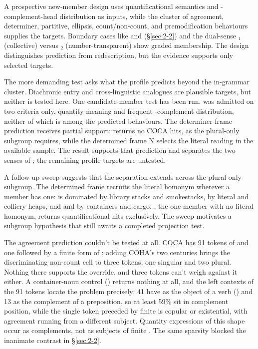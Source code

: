 A prospective new-member design uses quantificational semantics and -complement-head distribution as inputs, while the cluster of agreement, determiner, partitive, ellipsis, count/non-count, and premodification behaviours supplies the targets. Boundary cases like  and  (§\ref{sec:2-2}) and the dual-sense ₁ (collective) versus ₂ (number-transparent) show graded membership. The design distinguishes prediction from redescription, but the evidence supports only selected targets.

The more demanding test asks what the profile predicts beyond the in-grammar cluster. Diachronic entry and cross-linguistic analogues are plausible targets, but neither is tested here. One candidate-member test has been run.  was admitted on two criteria only, quantity meaning and frequent -complement distribution, neither of which is among the predicted behaviours. The determiner-frame prediction receives partial support:  returns no COCA hits, as the plural-only subgroup requires, while the determined frame  N selects the literal reading in the available sample. The result supports that prediction and separates the two senses of ; the remaining profile targets are untested.

A follow-up sweep suggests that the separation extends across the plural-only subgroup. The determined frame recruits the literal homonym wherever a member has one:  is dominated by library stacks and smokestacks,  by literal and colliery heaps, and  and  by containers and cargo. , the one member with no literal homonym, returns quantificational hits exclusively. The sweep motivates a subgroup hypothesis that still awaits a completed projection test.

The agreement prediction couldn't be tested at all. COCA has 91 tokens of  and one followed by a finite form of ; adding COHA's two centuries brings the discriminating non-count cell to three tokens, one singular and two plural. Nothing there supports the override, and three tokens can't weigh against it either. A container-noun control () returns nothing at all, and the left contexts of the 91 tokens locate the problem precisely: 41 have  as the object of a verb () and 13 as the complement of a preposition, so at least 59\% sit in complement position, while the single token preceded by finite  is copular or existential, with agreement running from a different subject. Quantity expressions of this shape occur as complements, not as subjects of finite . The same sparsity blocked the inanimate  contrast in §\ref{sec:2-2}.

